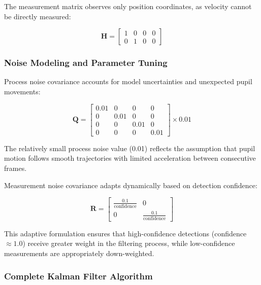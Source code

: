 \documentclass[conference]{IEEEtran}
\begin{document}
The measurement matrix observes only position coordinates, as velocity cannot be directly measured:

\begin{equation}
\mathbf{H} = \begin{bmatrix}
1 & 0 & 0 & 0 \\
0 & 1 & 0 & 0
\end{bmatrix}
\end{equation}

\subsubsection{Noise Modeling and Parameter Tuning}

Process noise covariance accounts for model uncertainties and unexpected pupil movements\cite{brown2012introduction}:

\begin{equation}
\mathbf{Q} = \begin{bmatrix}
0.01 & 0 & 0 & 0 \\
0 & 0.01 & 0 & 0 \\
0 & 0 & 0.01 & 0 \\
0 & 0 & 0 & 0.01
\end{bmatrix} \times 0.01
\end{equation}

The relatively small process noise value (0.01) reflects the assumption that pupil motion follows smooth trajectories with limited acceleration between consecutive frames\cite{simon2006optimal}.

Measurement noise covariance adapts dynamically based on detection confidence:

\begin{equation}
\mathbf{R} = \begin{bmatrix}
\frac{0.1}{\text{confidence}} & 0 \\
0 & \frac{0.1}{\text{confidence}}
\end{bmatrix}
\end{equation}

This adaptive formulation ensures that high-confidence detections (confidence $\approx 1.0$) receive greater weight in the filtering process, while low-confidence measurements are appropriately down-weighted\cite{thrun2005probabilistic}.

\subsubsection{Complete Kalman Filter Algorithm}
\end{document}
